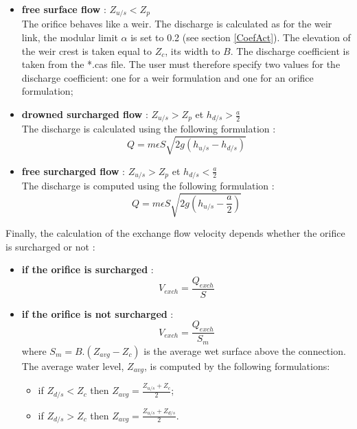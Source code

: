 \begin{itemize}
 \item \textbf{free surface flow} : $Z_{u/s} < Z_p$ \\
    The orifice behaves like a weir. The discharge is calculated as for the weir link, the modular limit $\alpha$ is set to 0.2 (see section \ref{CoefAct}). The elevation of the weir crest is taken equal to $Z_c$, its width to $B$. The discharge coefficient is taken from the *.cas file. The user must therefore specify two values for the discharge coefficient: one for a weir formulation and one for an orifice formulation;
 \item \textbf{drowned surcharged flow} : $Z_{u/s} > Z_p$ et $h_{d/s} > \frac{a}{2}$ \\
    The discharge is calculated using the following formulation :
    \begin{equation}
      Q = m \epsilon S \sqrt{2 g (h_{u/s}-h_{d/s})}
    \end{equation}
 \item \textbf{free surcharged flow} : $Z_{u/s} > Z_p$ et $h_{d/s} < \frac{a}{2}$ \\
    The discharge is computed using the following formulation :
    \begin{equation}
      Q = m \epsilon S \sqrt{2 g (h_{u/s}-\frac{a}{2})}
    \end{equation}
\end{itemize}

\vspace{0.5cm}

Finally, the calculation of the exchange flow velocity depends whether the orifice is surcharged or not :

\begin{itemize}
 \item \textbf{if the orifice is surcharged} :
   \begin{equation}
     V_{exch} = \frac{Q_{exch}}{S}
   \end{equation}
 \item \textbf{if the orifice is not surcharged} :
   \begin{equation}
     V_{exch} = \frac{Q_{exch}}{S_m}
   \end{equation}
   where $S_m = B . (Z_{avg}-Z_c)$ is the average wet surface above the connection. The average water level, $Z_{avg}$, is computed by the following formulations:
   \begin{itemize}
     \item if $Z_{d/s} < Z_c$ then $Z_{avg} = \frac{Z_{u/s}+Z_c}{2}$;
     \item if $Z_{d/s} > Z_c$ then $Z_{avg} = \frac{Z_{u/s}+Z_{d/s}}{2}$.
   \end{itemize}
\end{itemize}



